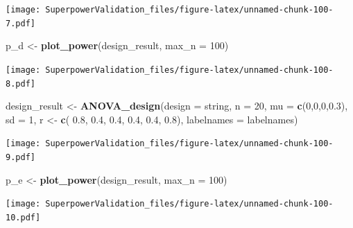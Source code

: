 \documentclass[]{book}
\newenvironment{Shaded}{\begin{snugshade}}{\end{snugshade}}
\newcommand{\DataTypeTok}[1]{\textcolor[rgb]{0.13,0.29,0.53}{#1}}
\newcommand{\DecValTok}[1]{\textcolor[rgb]{0.00,0.00,0.81}{#1}}
\newcommand{\FloatTok}[1]{\textcolor[rgb]{0.00,0.00,0.81}{#1}}
\newcommand{\KeywordTok}[1]{\textcolor[rgb]{0.13,0.29,0.53}{\textbf{#1}}}
\newcommand{\NormalTok}[1]{#1}
\newcommand{\StringTok}[1]{\textcolor[rgb]{0.31,0.60,0.02}{#1}}
\begin{document}
\texttt{[image: SuperpowerValidation\_files/figure-latex/unnamed-chunk-100-7.pdf]}

\begin{Shaded}
\begin{Highlighting}[]
\NormalTok{p_d <-}\StringTok{ }\KeywordTok{plot_power}\NormalTok{(design_result,}
                      \DataTypeTok{max_n =} \DecValTok{100}\NormalTok{)}
\end{Highlighting}
\end{Shaded}

\texttt{[image: SuperpowerValidation\_files/figure-latex/unnamed-chunk-100-8.pdf]}

\begin{Shaded}
\begin{Highlighting}[]
\NormalTok{design_result <-}\StringTok{ }\KeywordTok{ANOVA_design}\NormalTok{(}\DataTypeTok{design =}\NormalTok{ string,}
                              \DataTypeTok{n =} \DecValTok{20}\NormalTok{, }
                              \DataTypeTok{mu =} \KeywordTok{c}\NormalTok{(}\DecValTok{0}\NormalTok{,}\DecValTok{0}\NormalTok{,}\DecValTok{0}\NormalTok{,}\FloatTok{0.3}\NormalTok{), }
                              \DataTypeTok{sd =} \DecValTok{1}\NormalTok{, }
\NormalTok{                              r <-}\StringTok{ }\KeywordTok{c}\NormalTok{(}
                                \FloatTok{0.8}\NormalTok{, }\FloatTok{0.4}\NormalTok{, }\FloatTok{0.4}\NormalTok{,}
                                \FloatTok{0.4}\NormalTok{, }\FloatTok{0.4}\NormalTok{,}
                                \FloatTok{0.8}\NormalTok{), }
                              \DataTypeTok{labelnames =}\NormalTok{ labelnames)}
\end{Highlighting}
\end{Shaded}

\texttt{[image: SuperpowerValidation\_files/figure-latex/unnamed-chunk-100-9.pdf]}

\begin{Shaded}
\begin{Highlighting}[]
\NormalTok{p_e <-}\StringTok{ }\KeywordTok{plot_power}\NormalTok{(design_result,}
                      \DataTypeTok{max_n =} \DecValTok{100}\NormalTok{)}
\end{Highlighting}
\end{Shaded}

\texttt{[image: SuperpowerValidation\_files/figure-latex/unnamed-chunk-100-10.pdf]}
\end{document}
